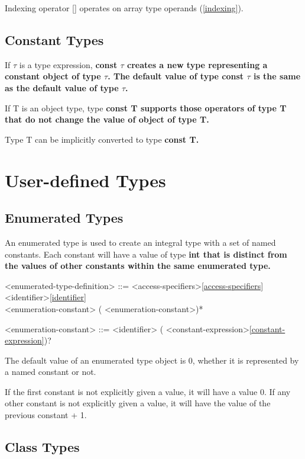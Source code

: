 \documentclass[a4paper,oneside,11pt]{article}
\begin{document}
Indexing operator [] operates on array type operands (\ref{indexing}).

\subsection{Constant Types}

If $\tau$ is a type expression, \bf{const} $\tau$ creates a new type representing a constant object of type $\tau$.
The default value of type \bf{const} $\tau$ is the same as the default value of type $\tau$.

If T is an object type, type \bf{const} T supports those operators of type T that do not change the value of object of type T.

Type T can be implicitly converted to type \bf{const} T.

\section{User-defined Types}

\subsection{Enumerated Types}\label{sec:enumerations}

An enumerated type is used to create an integral type with a set of named constants.
Each constant will have a value of type \bf{int} that is distinct
from the values of other constants within the same enumerated type.

\begin{grammar}
\label{enumerated-type-definition}<enumerated-type-definition> ::= <access-specifiers>\ref{access-specifiers}  <identifier>\ref{identifier}\\
                      \lit{(} <enumeration-constant> (\lit*{,} <enumeration-constant>)* \lit{)}

<enumeration-constant> ::= <identifier> (\lit*{=} <constant-expression>\ref{constant-expression})?
\end{grammar}

The default value of an enumerated type object is 0, whether it is represented by a named constant or not.

If the first constant is not explicitly given a value, it will have a value 0.
If any other constant is not explicitly given a value, it will have the value of the previous constant + 1.

\subsection{Class Types}\label{sec:classtypes}
\end{document}
